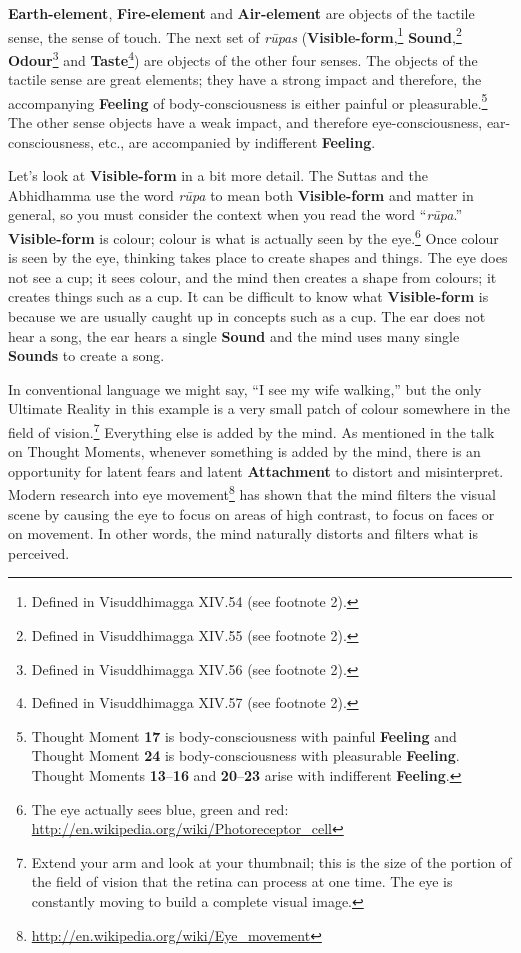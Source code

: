 \textbf{Earth-element}, \textbf{Fire-element} and \textbf{Air-element} are objects of the tactile sense, the sense of touch. The next set of \textit{rūpas} (\textbf{Visible-form},\footnote{Defined in Visuddhimagga XIV.54 (see footnote 2).} \textbf{Sound},\footnote{Defined in Visuddhimagga XIV.55 (see footnote 2).} \textbf{Odour}\footnote{Defined in Visuddhimagga XIV.56 (see footnote 2).} and \textbf{Taste}\footnote{Defined in Visuddhimagga XIV.57 (see footnote 2).}) are objects of the other four senses. The objects of the tactile sense are great elements; they have a strong impact and therefore, the accompanying \textbf{Feeling} of body-consciousness is either painful or pleasurable.\footnote{Thought Moment \textbf{17} is body-consciousness with painful \textbf{Feeling} and Thought Moment \textbf{24} is body-consciousness with pleasurable \textbf{Feeling}. Thought Moments \textbf{13}--\textbf{16} and \textbf{20}--\textbf{23} arise with indifferent \textbf{Feeling}.} The other sense objects have a weak impact, and therefore eye-consciousness, ear-consciousness, etc., are accompanied by indifferent \textbf{Feeling}.

Let’s look at \textbf{Visible-form} in a bit more detail. The Suttas and the Abhidhamma use the word \textit{rūpa} to mean both \textbf{Visible-form} and matter in general, so you must consider the context when you read the word “\textit{rūpa}.” \textbf{Visible-form} is colour; colour is what is actually seen by the eye.\footnote{The eye actually sees blue, green and red: \url{http://en.wikipedia.org/wiki/Photoreceptor_cell}} Once colour is seen by the eye, thinking takes place to create shapes and things. The eye does not see a cup; it sees colour, and the mind then creates a shape from colours; it creates things such as a cup. It can be difficult to know what \textbf{Visible-form} is because we are usually caught up in concepts such as a cup. The ear does not hear a song, the ear hears a single \textbf{Sound} and the mind uses many single \textbf{Sounds} to create a song.

In conventional language we might say, “I see my wife walking,” but the only Ultimate Reality in this example is a very small patch of colour somewhere in the field of vision.\footnote{Extend your arm and look at your thumbnail; this is the size of the portion of the field of vision that the retina can process at one time. The eye is constantly moving to build a complete visual image.} Everything else is added by the mind. As mentioned in the talk on Thought Moments, whenever something is added by the mind, there is an opportunity for latent fears and latent \textbf{Attachment} to distort and misinterpret. Modern research into eye movement\footnote{\url{http://en.wikipedia.org/wiki/Eye_movement}} has shown that the mind filters the visual scene by causing the eye to focus on areas of high contrast, to focus on faces or on movement. In other words, the mind naturally distorts and filters what is perceived.

